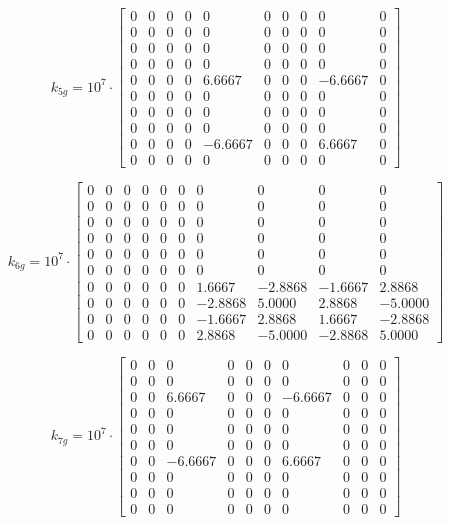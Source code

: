 \documentclass[8pt]{article}
\begin{document}
\[
k_{5g} = 10^7 \cdot 
\begin{bmatrix}
  0 & 0 & 0 & 0 & 0 & 0 & 0 & 0 & 0 & 0 \\
  0 & 0 & 0 & 0 & 0 & 0 & 0 & 0 & 0 & 0 \\
  0 & 0 & 0 & 0 & 0 & 0 & 0 & 0 & 0 & 0 \\
  0 & 0 & 0 & 0 & 0 & 0 & 0 & 0 & 0 & 0 \\
  0 & 0 & 0 & 0 & 6.6667 & 0 & 0 & 0 & -6.6667 & 0 \\
  0 & 0 & 0 & 0 & 0 & 0 & 0 & 0 & 0 & 0 \\
  0 & 0 & 0 & 0 & 0 & 0 & 0 & 0 & 0 & 0 \\
  0 & 0 & 0 & 0 & 0 & 0 & 0 & 0 & 0 & 0 \\
  0 & 0 & 0 & 0 & -6.6667 & 0 & 0 & 0 & 6.6667 & 0 \\
  0 & 0 & 0 & 0 & 0 & 0 & 0 & 0 & 0 & 0
\end{bmatrix}
\]

\[
k_{6g} = 10^7 \cdot 
\begin{bmatrix}
  0 & 0 & 0 & 0 & 0 & 0 & 0 & 0 & 0 & 0 \\
  0 & 0 & 0 & 0 & 0 & 0 & 0 & 0 & 0 & 0 \\
  0 & 0 & 0 & 0 & 0 & 0 & 0 & 0 & 0 & 0 \\
  0 & 0 & 0 & 0 & 0 & 0 & 0 & 0 & 0 & 0 \\
  0 & 0 & 0 & 0 & 0 & 0 & 0 & 0 & 0 & 0 \\
  0 & 0 & 0 & 0 & 0 & 0 & 0 & 0 & 0 & 0 \\
  0 & 0 & 0 & 0 & 0 & 0 & 1.6667 & -2.8868 & -1.6667 & 2.8868 \\
  0 & 0 & 0 & 0 & 0 & 0 & -2.8868 & 5.0000 & 2.8868 & -5.0000 \\
  0 & 0 & 0 & 0 & 0 & 0 & -1.6667 & 2.8868 & 1.6667 & -2.8868 \\
  0 & 0 & 0 & 0 & 0 & 0 & 2.8868 & -5.0000 & -2.8868 & 5.0000
\end{bmatrix}
\]

\[
k_{7g} = 10^7 \cdot 
\begin{bmatrix}
  0 & 0 & 0 & 0 & 0 & 0 & 0 & 0 & 0 & 0 \\
  0 & 0 & 0 & 0 & 0 & 0 & 0 & 0 & 0 & 0 \\
  0 & 0 & 6.6667 & 0 & 0 & 0 & -6.6667 & 0 & 0 & 0 \\
  0 & 0 & 0 & 0 & 0 & 0 & 0 & 0 & 0 & 0 \\
  0 & 0 & 0 & 0 & 0 & 0 & 0 & 0 & 0 & 0 \\
  0 & 0 & 0 & 0 & 0 & 0 & 0 & 0 & 0 & 0 \\
  0 & 0 & -6.6667 & 0 & 0 & 0 & 6.6667 & 0 & 0 & 0 \\
  0 & 0 & 0 & 0 & 0 & 0 & 0 & 0 & 0 & 0 \\
  0 & 0 & 0 & 0 & 0 & 0 & 0 & 0 & 0 & 0 \\
  0 & 0 & 0 & 0 & 0 & 0 & 0 & 0 & 0 & 0
\end{bmatrix}
\]
\end{document}
